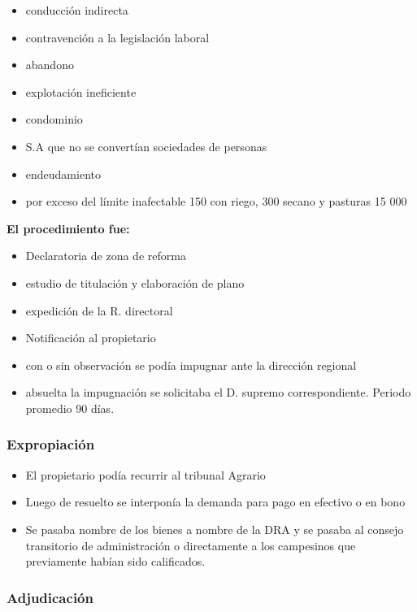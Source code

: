 \documentclass[
  letterpaper,
  DIV=11,
  numbers=noendperiod]{scrartcl}
\providecommand{\tightlist}{%
  \setlength{\itemsep}{0pt}\setlength{\parskip}{0pt}}\usepackage{longtable,booktabs,array}
\begin{document}
\begin{itemize}
\tightlist
\item
  conducción indirecta
\item
  contravención a la legislación laboral
\item
  abandono
\item
  explotación ineficiente
\item
  condominio
\item
  S.A que no se convertían sociedades de personas
\item
  endeudamiento
\item
  por exceso del límite inafectable 150 con riego, 300 secano y pasturas
  15 000
\end{itemize}

\textbf{El procedimiento fue:}

\begin{itemize}
\tightlist
\item
  Declaratoria de zona de reforma
\item
  estudio de titulación y elaboración de plano
\item
  expedición de la R. directoral
\item
  Notificación al propietario
\item
  con o sin observación se podía impugnar ante la dirección regional
\item
  absuelta la impugnación se solicitaba el D. supremo correspondiente.
  Periodo promedio 90 días.
\end{itemize}

\hypertarget{expropiaciuxf3n}{%
\subsubsection{Expropiación}\label{expropiaciuxf3n}}

\begin{itemize}
\tightlist
\item
  El propietario podía recurrir al tribunal Agrario
\item
  Luego de resuelto se interponía la demanda para pago en efectivo o en
  bono
\item
  Se pasaba nombre de los bienes a nombre de la DRA y se pasaba al
  consejo transitorio de administración o directamente a los campesinos
  que previamente habían sido calificados.
\end{itemize}

\hypertarget{adjudicaciuxf3n}{%
\subsubsection{Adjudicación}\label{adjudicaciuxf3n}}
\end{document}
